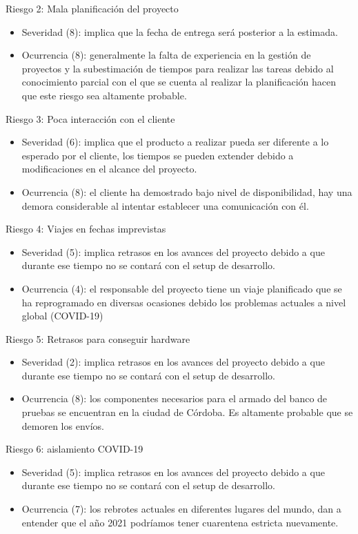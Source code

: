 \documentclass[11pt]{charter}
\begin{document}
Riesgo 2: Mala planificación del proyecto
\begin{itemize}
\item Severidad (8): implica que la fecha de entrega será posterior a la estimada.
\item Ocurrencia (8): generalmente la falta de experiencia en la gestión de proyectos y la subestimación de tiempos para realizar las tareas debido al conocimiento parcial con el que se cuenta al realizar la planificación hacen que este riesgo sea altamente probable.
\end{itemize}

Riesgo 3: Poca interacción con el cliente
\begin{itemize}
\item Severidad (6): implica que el producto a realizar pueda ser diferente a lo esperado por el cliente, los tiempos se pueden extender debido a modificaciones en el alcance del proyecto. 
\item Ocurrencia (8): el cliente ha demostrado bajo nivel de disponibilidad, hay una demora considerable al intentar establecer una comunicación con él. 
\end{itemize}

Riesgo 4: Viajes en fechas imprevistas
\begin{itemize}
\item Severidad (5): implica retrasos en los avances del proyecto debido a que durante ese tiempo no se contará con el setup de desarrollo.
\item Ocurrencia (4): el responsable del proyecto tiene un viaje planificado que se ha reprogramado en diversas ocasiones debido los problemas actuales a nivel global (COVID-19)
\end{itemize}

Riesgo 5: Retrasos para conseguir hardware
\begin{itemize}
\item Severidad (2): implica retrasos en los avances del proyecto debido a que durante ese tiempo no se contará con el setup de desarrollo.
\item Ocurrencia (8): los componentes necesarios para el armado del banco de pruebas se encuentran en la ciudad de Córdoba. Es altamente probable que se demoren los envíos.
\end{itemize}

Riesgo 6: aislamiento COVID-19
\begin{itemize}
\item Severidad (5): implica retrasos en los avances del proyecto debido a que durante ese tiempo no se contará con el setup de desarrollo.
\item Ocurrencia (7): los rebrotes actuales en diferentes lugares del mundo, dan a entender que el año 2021 podríamos tener cuarentena estricta nuevamente.
\end{itemize}
\end{document}
